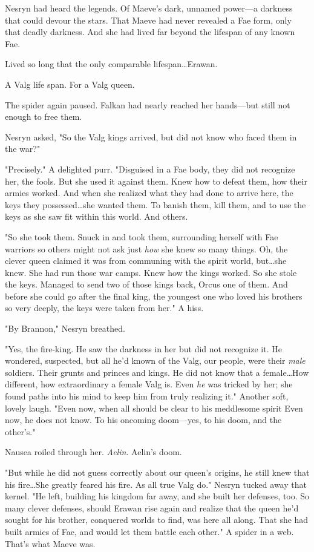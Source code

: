 Nesryn had heard the legends.
Of Maeve's dark, unnamed power---a darkness that could devour the stars.
That Maeve had never revealed a Fae form, only that deadly darkness.
And she had lived far beyond the lifespan of any known Fae.

Lived so long that the only comparable lifespan\ldots Erawan.

A Valg life span.
For a Valg queen.

The spider again paused.
Falkan had nearly reached her hands---but still not enough to free them.

Nesryn asked, "So the Valg kings arrived, but did not know who faced them in the war?"

"Precisely."
A delighted purr.
"Disguised in a Fae body, they did not recognize her, the fools.
But she used it against them.
Knew how to defeat them, how their armies worked.
And when she realized what they had done to arrive here, the keys they possessed\ldots she wanted them.
To banish them, kill them, and to use the keys as she saw fit within this world.
And others.

"So she took them.
Snuck in and took them, surrounding herself with Fae warriors so others might not ask just \emph{how} she knew so many things.
Oh, the clever queen claimed it was from communing with the spirit world, but\ldots she knew.
She had run those war camps.
Knew how the kings worked.
So she stole the keys.
Managed to send two of those kings back, Orcus one of them.
And before she could go after the final king, the youngest one who loved his brothers so very deeply, the keys were taken from her."
A hiss.

"By Brannon," Nesryn breathed.

"Yes, the fire-king.
He saw the darkness in her but did not recognize it.
He wondered, suspected, but all he'd known of the Valg, our people, were their \emph{male} soldiers.
Their grunts and princes and kings.
He did not know that a female\ldots How different, how extraordinary a female Valg is.
Even \emph{he} was tricked by her; she found paths into his mind to keep him from truly realizing it."
Another soft, lovely laugh.
"Even now, when all should be clear to his meddlesome spirit  Even now, he does not know.
To his oncoming doom---yes, to his doom, and the other's."

Nausea roiled through her.
\emph{Aelin}.
Aelin's doom.

"But while he did not guess correctly about our queen's origins, he still knew that his fire\ldots She greatly feared his fire.
As all true Valg do."
Nesryn tucked away that kernel.
"He left, building his kingdom far away, and she built her defenses, too.
So many clever defenses, should Erawan rise again and realize that the queen he'd sought for his brother, conquered worlds to find, was here all along.
That she had built armies of Fae, and would let them battle each other."
A spider in a web.
That's what Maeve was.

